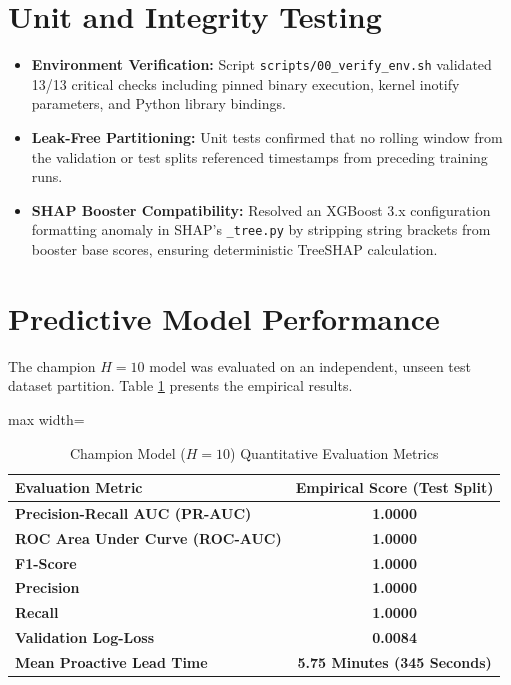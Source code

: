 \documentclass[12pt,a4paper]{report}
\newcommand{\code}[1]{\texttt{\small #1}}
\begin{document}
\section{Unit and Integrity Testing}
\begin{itemize}
    \item \textbf{Environment Verification:} Script \code{scripts/00\_verify\_env.sh} validated 13/13 critical checks including pinned binary execution, kernel inotify parameters, and Python library bindings.
    \item \textbf{Leak-Free Partitioning:} Unit tests confirmed that no rolling window from the validation or test splits referenced timestamps from preceding training runs.
    \item \textbf{SHAP Booster Compatibility:} Resolved an XGBoost 3.x configuration formatting anomaly in SHAP's \code{\_tree.py} by stripping string brackets from booster base scores, ensuring deterministic TreeSHAP calculation.
\end{itemize}

\section{Predictive Model Performance}
The champion $H=10$ model was evaluated on an independent, unseen test dataset partition. Table \ref{tab:model_metrics} presents the empirical results.

\begin{table}[h]
\centering
\caption{Champion Model ($H=10$) Quantitative Evaluation Metrics}
\label{tab:model_metrics}
\vspace{0.3cm}
\begin{adjustbox}{max width=\textwidth}
\begin{tabular}{lc}
\toprule
\textbf{Evaluation Metric} & \textbf{Empirical Score (Test Split)} \\
\midrule
\textbf{Precision-Recall AUC (PR-AUC)} & \textbf{1.0000} \\
\textbf{ROC Area Under Curve (ROC-AUC)} & \textbf{1.0000} \\
\textbf{F1-Score} & \textbf{1.0000} \\
\textbf{Precision} & \textbf{1.0000} \\
\textbf{Recall} & \textbf{1.0000} \\
\textbf{Validation Log-Loss} & \textbf{0.0084} \\
\textbf{Mean Proactive Lead Time} & \textbf{5.75 Minutes (345 Seconds)} \\
\bottomrule
\end{tabular}
\end{adjustbox}
\end{table}
\end{document}
